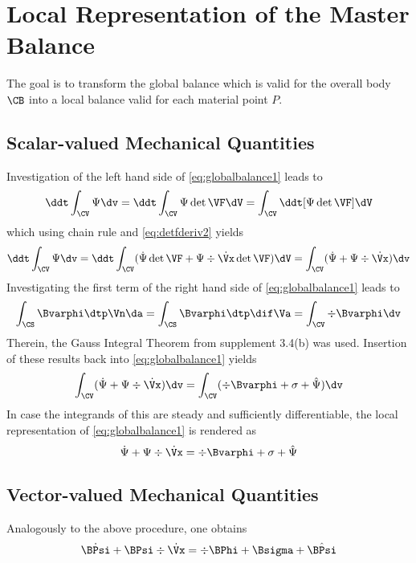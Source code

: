 \documentclass[a5paper,twosided,11pt,DIV=15,BCOR=0mm]{scrbook}
\begin{document}
\section{Local Representation of the Master Balance}
The goal is to transform the global balance which is valid for the overall body
$\CB$ into a local balance valid for each material point $P$.

\subsection{Scalar-valued Mechanical Quantities}
Investigation of the left hand side of \eqref{eq:globalbalance1} leads to
%
\begin{equation}
  \ddt\int_\CV\Psi\dv=\ddt\int_\CV\Psi\det\VF\dV=\int_\CV\ddt[\Psi\det\VF]\dV
\end{equation}
%
which using chain rule and \eqref{eq:detfderiv2} yields
%
\begin{equation}
  \ddt\int_\CV\Psi\dv=\ddt\int_\CV(\dot{\Psi}\det\VF+\Psi\div\dot{\Vx}\det\VF)\dV
  = \int_\CV(\dot{\Psi}+\Psi\div\dot{\Vx})\dv
\end{equation}
%
Investigating the first term of the right hand side of \eqref{eq:globalbalance1}
leads to
%
\begin{equation}
  \int_\CS\Bvarphi\dtp\Vn\da = \int_\CS\Bvarphi\dtp\dif\Va = \int_\CV\div\Bvarphi\dv
\end{equation}
%
Therein, the Gauss Integral Theorem from supplement 3.4(b) was used. Insertion
of these results back into \eqref{eq:globalbalance1} yields
%
\begin{equation}
  \int_\CV(\dot{\Psi}+\Psi\div\dot{\Vx})\dv = \int_\CV(\div\Bvarphi+\sigma+\hat{\Psi})\dv
\end{equation}
%
In case the integrands of this are steady and sufficiently differentiable, the
local representation of \eqref{eq:globalbalance1} is rendered as
%
\begin{equation}
  \dot{\Psi}+\Psi\div\dot{\Vx} = \div\Bvarphi+\sigma+\hat{\Psi}
\end{equation}

\subsection{Vector-valued Mechanical Quantities}
Analogously to the above procedure, one obtains
%
\begin{equation}
  \dot{\BPsi}+\BPsi\div\dot{\Vx} = \div \BPhi + \Bsigma + \hat{\BPsi}
\end{equation}
%
\end{document}
